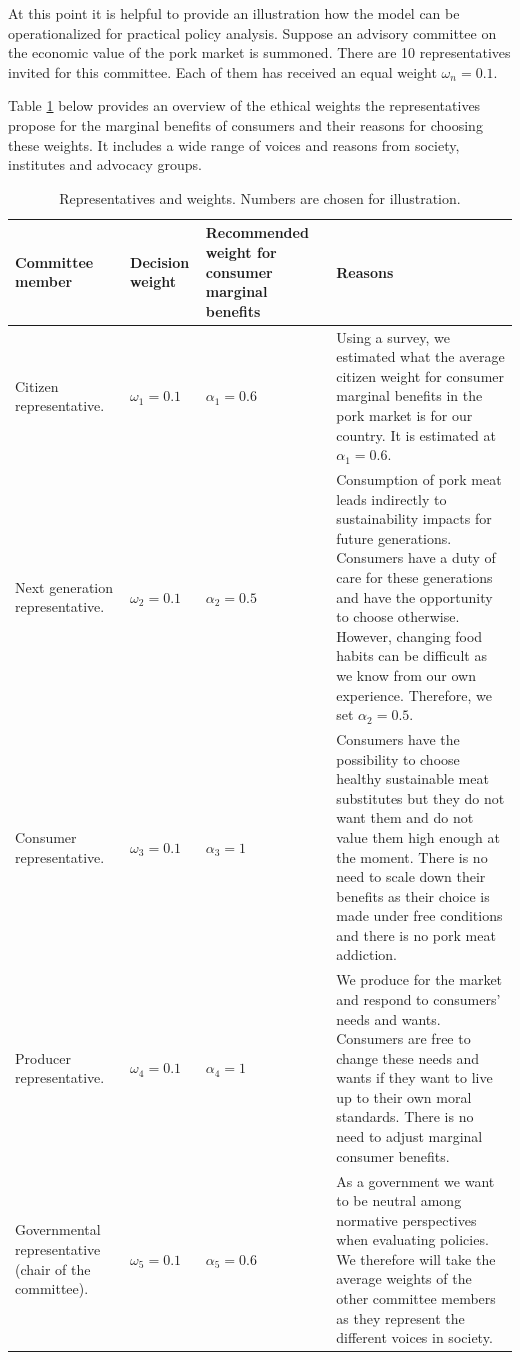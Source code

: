 \documentclass[
]{book}
\begin{document}
At this point it is helpful to provide an illustration how the model can be operationalized for practical policy analysis. Suppose an advisory committee on the economic value of the pork market is summoned. There are 10 representatives invited for this committee. Each of them has received an equal weight \(\omega_n=0.1\).

Table \ref{tab:representatives} below provides an overview of the ethical weights the representatives propose for the marginal benefits of consumers and their reasons for choosing these weights. It includes a wide range of voices and reasons from society, institutes and advocacy groups.

\begin{table}

\caption{\label{tab:representatives}Representatives and weights. Numbers are chosen for illustration.}
\centering
\begin{tabular}[t]{llll}
\toprule
Committee member & Decision weight & Recommended weight for consumer marginal benefits & Reasons\\
\midrule
Citizen representative. & $\omega_1 = 0.1$ & $\alpha_1 = 0.6$ & Using a survey, we estimated what the average citizen weight for consumer marginal benefits in the pork market is for our country. It is estimated at $\alpha_1=0.6$.\\
Next generation representative. & $\omega_2 = 0.1$ & $\alpha_2 = 0.5$ & Consumption of pork meat leads indirectly to sustainability impacts for future generations. Consumers have a duty of care for these generations and have the opportunity to choose otherwise. However, changing food habits can be difficult as we know from our own experience. Therefore, we set $\alpha_2=0.5$.\\
Consumer representative. & $\omega_3 = 0.1$ & $\alpha_3 = 1$ & Consumers have the possibility to choose healthy sustainable meat substitutes but they do not want them and do not value them high enough at the moment. There is no need to scale down their benefits as their choice is made under free conditions and there is no pork meat addiction.\\
Producer representative. & $\omega_4 = 0.1$ & $\alpha_4 = 1$ & We produce for the market and respond to consumers’ needs and wants. Consumers are free to change these needs and wants if they want to live up to their own moral standards. There is no need to adjust marginal consumer benefits.\\
Governmental representative (chair of the committee). & $\omega_5 = 0.1$ & $\alpha_5 = 0.6$ & As a government we want to be neutral among normative perspectives when evaluating policies. We therefore will take the average weights of the other committee members as they represent the different voices in society.\\

\end{tabular}
\end{table}
\end{document}
